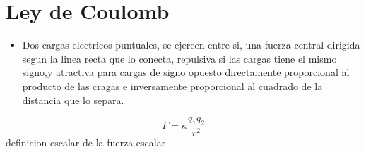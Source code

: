 \section{Ley de Coulomb}
    \begin{itemize}
        \item Dos cargas electricos puntuales, se ejercen entre si, una fuerza central dirigida segun la linea recta que lo conecta, repulsiva  si las cargas tiene el mismo signo,y atractiva para cargas de signo opuesto directamente proporcional al producto de las cragas e inversamente proporcional al cuadrado de la distancia que lo separa. 
    \end{itemize}
    \begin{equation}
        F=\kappa\frac{q_1 q_2}{r^2}
    \end{equation}
definicion escalar de la fuerza escalar

